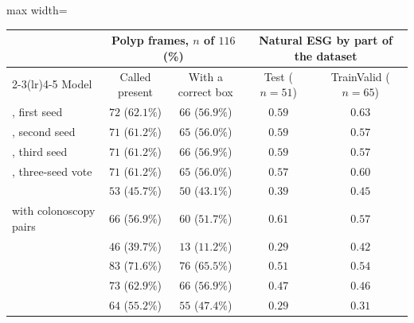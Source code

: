 \begin{table}[!htbp]
\vspace{0.6em}
\begin{adjustbox}{max width=\linewidth}
\begin{tabular}{l cc cc}
\toprule
 & \multicolumn{2}{c}{Polyp frames, $n$ of $116$ (\%)} & \multicolumn{2}{c}{Natural ESG by part of the dataset} \\
\cmidrule(lr){2-3}\cmidrule(lr){4-5}
Model & Called present & With a correct box & Test ($n = 51$) & TrainValid ($n = 65$) \\
\midrule
\msn{}, first seed & $72$ ($62.1\%$) & $66$ ($56.9\%$) & $0.59$ & $0.63$ \\
\msn{}, second seed & $71$ ($61.2\%$) & $65$ ($56.0\%$) & $0.59$ & $0.57$ \\
\msn{}, third seed & $71$ ($61.2\%$) & $66$ ($56.9\%$) & $0.59$ & $0.57$ \\
\msn{}, three-seed vote & $71$ ($61.2\%$) & $65$ ($56.0\%$) & $0.57$ & $0.60$ \\
\ms{} & $53$ ($45.7\%$) & $50$ ($43.1\%$) & $0.39$ & $0.45$ \\
\msp{} with colonoscopy pairs & $66$ ($56.9\%$) & $60$ ($51.7\%$) & $0.61$ & $0.57$ \\
\base{} & $46$ ($39.7\%$) & $13$ ($11.2\%$) & $0.29$ & $0.42$ \\
\gem{} & $83$ ($71.6\%$) & $76$ ($65.5\%$) & $0.51$ & $0.54$ \\
\opus{} & $73$ ($62.9\%$) & $66$ ($56.9\%$) & $0.47$ & $0.46$ \\
\gpt{} & $64$ ($55.2\%$) & $55$ ($47.4\%$) & $0.29$ & $0.31$ \\
\bottomrule
\end{tabular}
\end{adjustbox}
\end{table}

